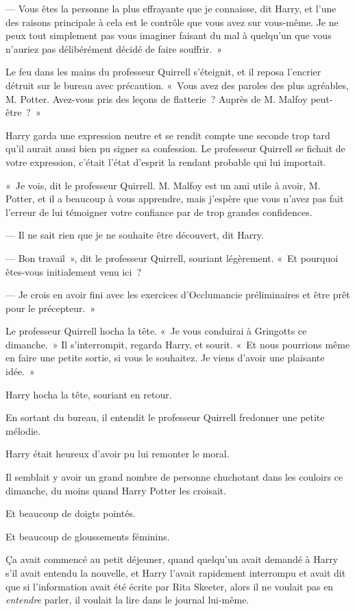 --- Vous êtes la personne la plus effrayante que je connaisse, dit Harry, et l'une des raisons principale à cela est le contrôle que vous avez sur vous-même. Je ne peux tout simplement pas vous imaginer faisant du mal à quelqu'un que vous n'auriez pas délibérément décidé de faire souffrir.~»

Le feu dans les mains du professeur Quirrell s'éteignit, et il reposa l'encrier détruit sur le bureau avec précaution. «~Vous avez des paroles des plus agréables, M. Potter. Avez-vous pris des leçons de flatterie~? Auprès de M. Malfoy peut-être~?~»

Harry garda une expression neutre et se rendit compte une seconde trop tard qu'il aurait aussi bien pu signer sa confession. Le professeur Quirrell se fichait de votre expression, c'était l'état d'esprit la rendant probable qui lui importait.

«~Je vois, dit le professeur Quirrell. M. Malfoy est un ami utile à avoir, M. Potter, et il a beaucoup à vous apprendre, mais j'espère que vous n'avez pas fait l'erreur de lui témoigner votre confiance par de trop grandes confidences.

--- Il ne sait rien que je ne souhaite être découvert, dit Harry.

--- Bon travail~», dit le professeur Quirrell, souriant légèrement. «~Et pourquoi êtes-vous initialement venu ici~?

--- Je crois en avoir fini avec les exercices d'Occlumancie préliminaires et être prêt pour le précepteur.~»

Le professeur Quirrell hocha la tête. «~Je vous conduirai à Gringotts ce dimanche.~» Il s'interrompit, regarda Harry, et sourit. «~Et nous pourrions même en faire une petite sortie, si vous le souhaitez. Je viens d'avoir une plaisante idée.~»

Harry hocha la tête, souriant en retour.

En sortant du bureau, il entendit le professeur Quirrell fredonner une petite mélodie.

Harry était heureux d'avoir pu lui remonter le moral.

\later

Il semblait y avoir un grand nombre de personne chuchotant dans les couloirs ce dimanche, du moins quand Harry Potter les croisait.

Et beaucoup de doigts pointés.

Et beaucoup de gloussements féminins.

Ça avait commencé au petit déjeuner, quand quelqu'un avait demandé à Harry s'il avait entendu la nouvelle, et Harry l'avait rapidement interrompu et avait dit que si l'information avait été écrite par Rita Skeeter, alors il ne voulait pas en \emph{entendre} parler, il voulait la lire dans le journal lui-même.

